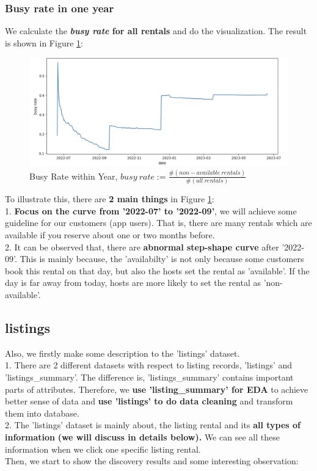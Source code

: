 \documentclass{article}
\begin{document}
	\subsubsection{Busy rate in one year}
	We calculate the \textbf{\textit{busy rate} for all rentals} and do the visualization. The result is shown in Figure \ref{fig:003}:
	\begin{figure}[h]
		\centering
		\includegraphics[width=.43\textheight]{busy_rate_year.png}
		\caption{Busy Rate within Year, $busy\  rate := \frac{\# (non-available\ rentals)}{\# (all\  rentals)}$}
		\label{fig:003}
	\end{figure}
	\newpage
	\noindent
	To illustrate this, there are \textbf{2 main things} in Figure \ref{fig:003}:
	\vspace{3pt}
	\\
	1. \textbf{Focus on the curve from '2022-07' to '2022-09'}, we will achieve some guideline for our customers (app users). That is, there are many rentals which are available if you reserve about one or two months before.
	\\
	2. It can be observed that, there are \textbf{abnormal step-shape curve} after '2022-09'. This is mainly because, the 'availabilty' is not only because some customers book this rental on that day, but also the hosts set the rental as 'available'. If the day is far away from today, hosts are more likely to set the rental as 'non-available'.
	\subsection{listings}
	Also, we firstly make some description to the 'listings' dataset.
	\vspace{3pt}
	\\
	1. There are 2 different datasets with respect to listing records, 'listings' and 'listings\_summary'. The difference is, 'listings\_summary' contains important parts of attributes. Therefore, we \textbf{use 'listing\_summary' for EDA} to achieve better sense of data and \textbf{use 'listings' to do data cleaning} and transform them into database.
	\\
	2. The 'listings' dataset is mainly about, the listing rental and its \textbf{all types of information} \textbf{(we will discuss in details below).} We can see all these information when we click one specific listing rental.
	\vspace{3pt}
	\\
	Then, we start to show the discovery results and some interesting observation:
\end{document}
